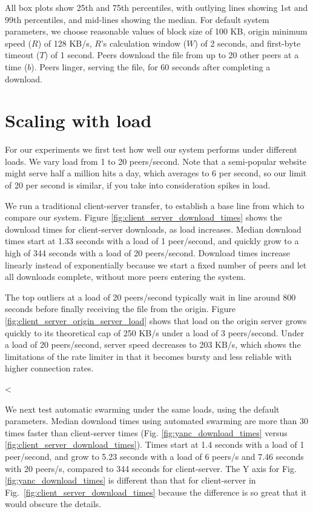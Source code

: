 All box plots show 25th and 75th percentiles, with outlying lines showing 1st and 99th percentiles, and mid-lines showing the median.
For default system parameters, we choose reasonable values of block size of 100 KB, origin minimum speed ($R$) of 128 KB/s, $R$'s calculation window ($W$) 
of 2 seconds, and first-byte timeout ($T$) of 1 second.  Peers download the file from up to 20 other peers at a time ($b$).
Peers linger, serving the file, for 60 seconds after completing a download.

\section{Scaling with load}

For our experiments we first test how well our system performs under different loads.  We vary load from 1 to 20 peers/second.  
Note that a semi-popular website might serve half a million hits a day,
which averages to 6 per second, so our limit of 20 per second is similar, if you take into consideration spikes in load.

We run a traditional client-server transfer, to establish a base line from which to compare 
our system. Figure \ref{fig:client_server_download_times} shows the download times for client-server 
downloads, as load increases.  Median download times start at 1.33 seconds with a load of 1 peer/second,
and quickly grow to a high of 344 seconds with a load of 20 peers/second. 
Download times increase linearly instead of exponentially because we start a fixed number of peers and let all downloads complete, without more peers
entering the system.

The top outliers at a load of 20 peers/second typically wait in line around 800 seconds before 
finally receiving the file from the origin. Figure \ref{fig:client_server_origin_server_load} shows that load on the origin server grows quickly to its 
theoretical cap of 250 KB/s under a load of 3 peers/second. Under a load of 20 peers/second, server speed decreases to 203 KB/s, which 
shows the limitations of the rate limiter in that it becomes bursty and less reliable with higher connection rates.

<%

We next test automatic swarming under the same loads, using the default parameters. 
Median download times using automated swarming are more than 30 times faster than client-server times (Fig. \ref{fig:yanc_download_times} versus \ref{fig:client_server_download_times}).
Times start at 1.4 seconds with a load of 1 peer/second, and grow 
to 5.23 seconds with a load of 6 peers/s and 7.46 seconds with 20 peers/s, compared to 344 seconds for client-server.
The Y axis for Fig. \ref{fig:yanc_download_times} is different than that for client-server in 
Fig.~\ref{fig:client_server_download_times} because the difference is so great that it would obscure the details. 

